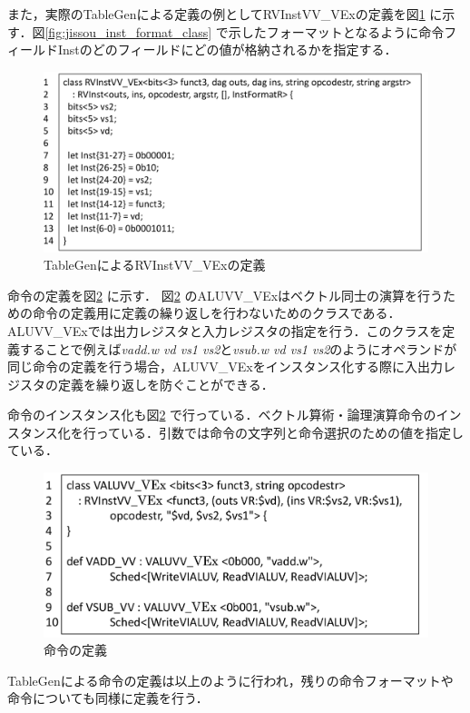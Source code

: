 また，実際のTableGenによる定義の例としてRVInstVV\_VExの定義を図\ref{fig:RVInstVVMIQS}
に示す．図\ref{fig:jissou_inst_format_class}
で示したフォーマットとなるように命令フィールドInstのどのフィールドにどの値が格納されるかを指定する．

\begin{figure}[tb]
    \centering
    \includegraphics[scale=0.6]{image/RVInstVVMIQS_v2.pdf}
    \caption{TableGenによるRVInstVV\_VExの定義}
    \label{fig:RVInstVVMIQS}
\end{figure}

命令の定義を図\ref{fig:Inst_def}
に示す．
図\ref{fig:Inst_def}
のALUVV\_VExはベクトル同士の演算を行うための命令の定義用に定義の繰り返しを行わないためのクラスである．ALUVV\_VExでは出力レジスタと入力レジスタの指定を行う．このクラスを定義することで例えば\textit{vadd.w vd vs1 vs2}と\textit{vsub.w vd vs1 vs2}のようにオペランドが同じ命令の定義を行う場合，ALUVV\_VExをインスタンス化する際に入出力レジスタの定義を繰り返しを防ぐことができる．

命令のインスタンス化も図\ref{fig:Inst_def}
で行っている．ベクトル算術・論理演算命令のインスタンス化を行っている．引数では命令の文字列と命令選択のための値を指定している．

\begin{figure}[tb]
    \centering
    \includegraphics[scale=0.6]{image/Instruction_define.pdf}
    \caption{命令の定義}
    \label{fig:Inst_def}
\end{figure}

TableGenによる命令の定義は以上のように行われ，残りの命令フォーマットや命令についても同様に定義を行う．
